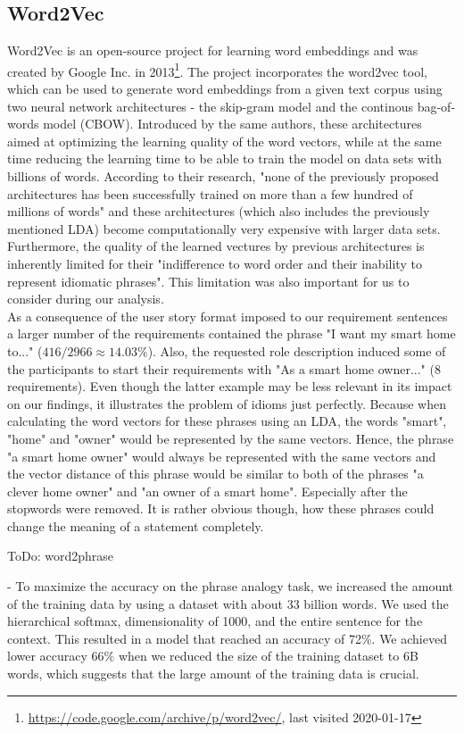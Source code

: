 \subsection{Word2Vec} %
\label{sub:word_2_vec}
Word2Vec is an open-source project for learning word embeddings and was created by Google Inc. in 2013\footnote{\label{word2vec_link}\url{https://code.google.com/archive/p/word2vec/}, last visited 2020-01-17}. The project incorporates the word2vec tool, which can be used to generate word embeddings from a given text corpus using two neural network architectures - the skip-gram model and the continous bag-of-words model (CBOW). Introduced by the same authors, these architectures aimed at optimizing the learning quality of the word vectors, while at the same time reducing the learning time to be able to train the model on data sets with billions of words\cite{mikolov_efficient_2013}. According to their research, "none of the previously proposed architectures has been successfully trained on more than a few hundred of millions of words"\cite[p1]{mikolov_efficient_2013} and these architectures (which also includes the previously mentioned LDA) become computationally very expensive with larger data sets. Furthermore, the quality of the learned vectures by previous architectures is inherently limited for their "indifference to word order and their inability to represent idiomatic phrases"\cite[p1]{mikolov_distributed_2013}. This limitation was also important for us to consider during our analysis.\\
As a consequence of the user story format imposed to our requirement sentences a larger number of the requirements contained the phrase "I want my smart home to..." ($416 / 2966 \approx14.03\%$). Also, the requested role description induced some of the participants to start their requirements with "As a smart home owner..." (8 requirements). Even though the latter example may be less relevant in its impact on our findings, it illustrates the problem of idioms just perfectly. Because when calculating the word vectors for these phrases using an LDA, the words "smart", "home" and "owner" would be represented by the same vectors. Hence, the phrase "a smart home owner" would always be represented with the same vectors and the vector distance of this phrase would be similar to both of the phrases "a clever home owner" and "an owner of a smart home". Especially after the stopwords were removed. It is rather obvious though, how these phrases could change the meaning of a statement completely.

\colorbox{yellow!30}{ToDo: word2phrase} 

- To maximize the accuracy on the phrase analogy task, we increased the amount of the training data
by using a dataset with about 33 billion words. We used the hierarchical softmax, dimensionality
of 1000, and the entire sentence for the context. This resulted in a model that reached an accuracy
of 72\%. We achieved lower accuracy 66\% when we reduced the size of the training dataset to 6B words, which suggests that the large amount of the training data is crucial.


